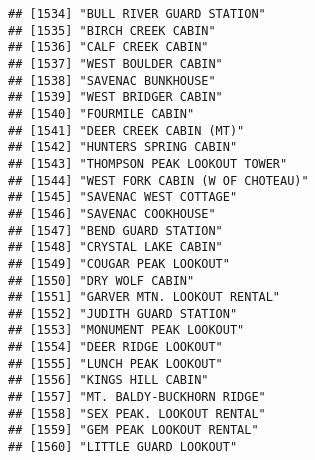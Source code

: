 \documentclass[
]{article}
\begin{document}
\begin{verbatim}
## [1534] "BULL RIVER GUARD STATION"                                                            
## [1535] "BIRCH CREEK CABIN"                                                                   
## [1536] "CALF CREEK CABIN"                                                                    
## [1537] "WEST BOULDER CABIN"                                                                  
## [1538] "SAVENAC BUNKHOUSE"                                                                   
## [1539] "WEST BRIDGER CABIN"                                                                  
## [1540] "FOURMILE CABIN"                                                                      
## [1541] "DEER CREEK CABIN (MT)"                                                               
## [1542] "HUNTERS SPRING CABIN"                                                                
## [1543] "THOMPSON PEAK LOOKOUT TOWER"                                                         
## [1544] "WEST FORK CABIN (W OF CHOTEAU)"                                                      
## [1545] "SAVENAC WEST COTTAGE"                                                                
## [1546] "SAVENAC COOKHOUSE"                                                                   
## [1547] "BEND GUARD STATION"                                                                  
## [1548] "CRYSTAL LAKE CABIN"                                                                  
## [1549] "COUGAR PEAK LOOKOUT"                                                                 
## [1550] "DRY WOLF CABIN"                                                                      
## [1551] "GARVER MTN. LOOKOUT RENTAL"                                                          
## [1552] "JUDITH GUARD STATION"                                                                
## [1553] "MONUMENT PEAK LOOKOUT"                                                               
## [1554] "DEER RIDGE LOOKOUT"                                                                  
## [1555] "LUNCH PEAK LOOKOUT"                                                                  
## [1556] "KINGS HILL CABIN"                                                                    
## [1557] "MT. BALDY-BUCKHORN RIDGE"                                                            
## [1558] "SEX PEAK. LOOKOUT RENTAL"                                                            
## [1559] "GEM PEAK LOOKOUT RENTAL"                                                             
## [1560] "LITTLE GUARD LOOKOUT"                                                                

\end{verbatim}
\end{document}
